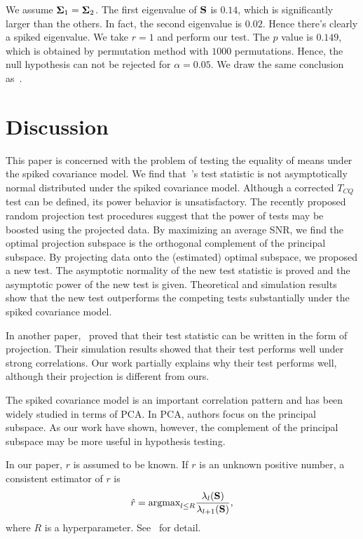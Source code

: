 \documentclass[3p]{elsarticle}
\theoremstyle{plain}
\theoremstyle{definition}
\theoremstyle{remark}
\begin{document}
We assume $\boldsymbol{\Sigma}_1=\boldsymbol{\Sigma}_2$.
The first eigenvalue of $\mathbf{S}$ is $0.14$, which is significantly larger than the others.
In fact, the second eigenvalue is $0.02$.
Hence there's clearly a spiked eigenvalue.
We take $r=1$ and perform our test.
The $p$ value is $0.149$, which is obtained by permutation method with $1000$ permutations.
Hence, the null hypothesis can not be rejected for $\alpha=0.05$.
We draw the same conclusion as~\cite{Ma2015A}.

\section{Discussion}



This paper is concerned with the problem of testing the equality of means under the spiked covariance model.
We find that~\cite{Chen2010A}'s test statistic is not asymptotically normal distributed under the spiked covariance model. 
Although a corrected $T_{CQ}$ test can be defined, its power behavior is unsatisfactory.
The recently proposed random projection test procedures suggest that the power of tests may be boosted using the projected data.
By maximizing an average SNR, we find the optimal projection subspace is the orthogonal complement of the principal subspace.
By projecting data onto the (estimated) optimal subspace, we proposed a new test.
The asymptotic normality of the new test statistic is proved and the asymptotic power of the new test is given.
    Theoretical and simulation results show that the new test outperforms the competing tests substantially under the spiked covariance model.


In another paper,~\cite{Zhao2016A} proved that their test statistic can be written in the form of projection. Their simulation results showed that their test performs well under strong correlations.
Our work partially explains why their test performs well, although their projection is different from ours. 

 The spiked covariance model is an important correlation pattern and has been widely studied in terms of PCA\@.
 In PCA, authors focus on the principal subspace.
 As our work have shown, however, the complement of the principal subspace may be more useful in hypothesis testing. 

In our paper, $r$ is assumed to be known. If $r$ is an unknown positive number, a consistent estimator of $r$ is
\begin{equation*}
    \hat{r}=\textrm{argmax}_{l\leq R}\frac{\lambda_l(\mathbf{S})}{\lambda_{l+1}(\mathbf{S})},
\end{equation*}
where $R$ is a hyperparameter.
    See~\cite{Ahn2009Eigenvalue} for detail.
\end{document}
